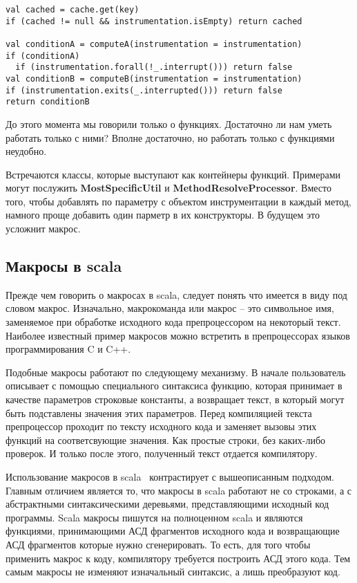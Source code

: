 \begin{lstlisting}[caption={Влияние на первоначальную логику},label=lst:cond]
val cached = cache.get(key)
if (cached != null && instrumentation.isEmpty) return cached

val conditionA = computeA(instrumentation = instrumentation)
if (conditionA)
  if (instrumentation.forall(!_.interrupt())) return false
val conditionB = computeB(instrumentation = instrumentation)
if (instrumentation.exits(_.interrupted())) return false
return conditionB
\end{lstlisting}

До этого момента мы говорили только о функциях.
Достаточно ли нам уметь работать только с ними?
Вполне достаточно, но работать только с функциями неудобно.

Встречаются классы, которые выступают как контейнеры функций.
Примерами могут послужить \textbf{MostSpecificUtil} и
\textbf{MethodResolveProcessor}.
Вместо того, чтобы добавлять по параметру с объектом инструментации в каждый
метод, намного проще добавить один парметр в их конструкторы.
В будущем это усложнит макрос. %

\subsection{Макросы в scala}
\label{sec:macroScala}

Прежде чем говорить о макросах в scala, следует понять что имеется в виду под
словом макрос.
Изначально, макрокоманда или макрос -- это символьное имя,
заменяемое при обработке исходного кода препроцессором на некоторый текст.
Наиболее известный пример макросов можно встретить в препроцессорах языков
программирования C и C++.

Подобные макросы работают по следующему механизму.
В начале пользователь описывает с помощью специального синтаксиса функцию,
которая принимает в качестве параметров строковые константы, а возвращает текст,
в который могут быть подставлены значения этих параметров.
Перед компиляцией текста препроцессор проходит по тексту исходного кода и заменяет
вызовы этих функций на соответсвующие значения.
Как простые строки, без каких-либо проверок.
И только после этого, полученный текст отдается компилятору.

Использование макросов в scala~\cite{macros} контрастирует с вышеописанным подходом.
Главным отличием является то, что макросы в scala работают не со строками,
а с абстрактными синтаксическими деревьями, представляющими исходный код
программы.
Scala макросы пишутся на полноценном scala и являются функциями, принимающими
АСД фрагментов исходного кода и возвращающие АСД фрагментов которые нужно
сгенерировать.
То есть, для того чтобы применить макрос к коду, компилятору требуется построить
АСД этого кода. Тем самым макросы не изменяют изначальный синтаксис, а лишь
преобразуют код.

